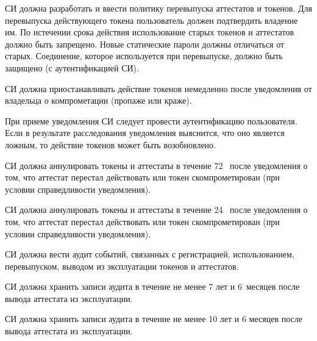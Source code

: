 
СИ должна разработать и ввести политику перевыпуска аттестатов и токенов.
Для перевыпуска действующего токена пользователь должен 
подтвердить владение им. По истечении срока действия
использование старых токенов и аттестатов должно быть запрещено. 
Новые статические пароли должны отличаться от старых. 
Соединение, которое используется при перевыпуске, должно быть защищено 
(с аутентификацией СИ). 




СИ должна приостанавливать действие токенов немедленно после 
уведомления от владельца о компрометации (пропаже или краже).

\begin{note*}
При приеме уведомления СИ следует провести аутентификацию пользователя.
%
Если в результате расследования уведомления выяснится, что оно является 
ложным, то действие токенов может быть возобновлено.
\end{note*}


СИ должна аннулировать токены и аттестаты в течение 72~ 
после уведомления о том, что аттестат перестал действовать 
или токен скомпрометирован (при условии справедливости уведомления).

СИ должна аннулировать токены и аттестаты в течение 24~ 
после уведомления о том, что аттестат перестал действовать 
или токен скомпрометирован (при условии справедливости уведомления). 

СИ должна вести аудит событий, связанных с регистрацией, использованием, 
перевыпуском, выводом из эксплуатации токенов и аттестатов.  


СИ должна хранить записи аудита в течение не менее 7 лет и 6~месяцев после 
вывода аттестата из эксплуатации.  

СИ должна хранить записи аудита в течение не менее 10 лет и 6 месяцев 
после вывода аттестата из эксплуатации.  
